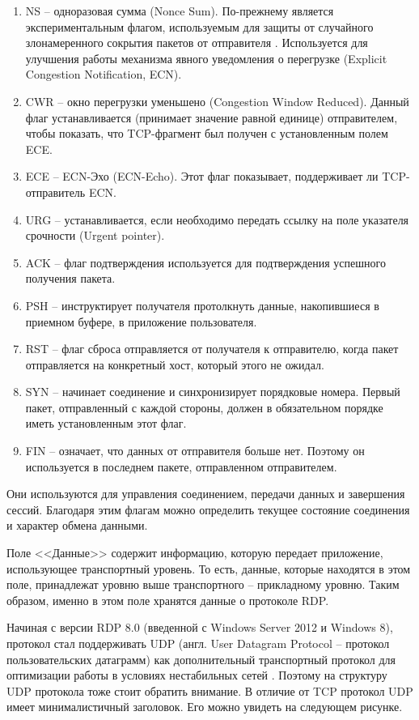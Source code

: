 \documentclass[spec, och, diploma]{SCWorks}
\begin{document}
\begin{enumerate}
  \item NS -- одноразовая сумма (Nonce Sum). По-прежнему является экспериментальным флагом, используемым для защиты от случайного
  злонамеренного сокрытия пакетов от отправителя \cite{tcpflags}. Используется для улучшения работы механизма явного уведомления 
  о перегрузке (Explicit Congestion Notification, ECN).
  \item CWR -- окно перегрузки уменьшено (Congestion Window Reduced). 
  Данный флаг устанавливается (принимает значение равной единице) отправителем, чтобы показать, что TCP-фрагмент был
  получен с установленным полем ECE.
  \item ECE -- ECN-Эхо (ECN-Echo). Этот флаг показывает, поддерживает ли TCP-отправитель ECN.
  \item URG -- устанавливается, если необходимо передать ссылку на поле указателя срочности (Urgent pointer).
  \item ACK -- флаг подтверждения используется для подтверждения успешного получения пакета.
  \item PSH -- инструктирует получателя протолкнуть данные, накопившиеся в приемном буфере, в приложение пользователя.
  \item RST -- флаг сброса отправляется от получателя к отправителю, когда пакет отправляется на конкретный хост, который этого не ожидал.
  \item SYN -- начинает соединение и синхронизирует порядковые номера. Первый пакет, отправленный с каждой стороны, должен в обязательном порядке иметь установленным этот флаг.
  \item FIN -- означает, что данных от отправителя больше нет. Поэтому он используется в последнем пакете, отправленном отправителем.
\end{enumerate}

Они используются для управления соединением, передачи данных и завершения сессий.
Благодаря этим флагам можно определить текущее состояние соединения и характер обмена данными.

Поле <<Данные>> содержит информацию, которую передает приложение, использующее транспортный уровень. То есть, данные, которые 
находятся в этом поле, принадлежат уровню выше транспортного -- прикладному уровню. Таким образом, именно в этом поле хранятся данные о протоколе RDP.

Начиная с версии RDP 8.0 (введенной с Windows Server 2012 и Windows 8), протокол стал поддерживать UDP (англ. User Datagram Protocol -- протокол пользовательских датаграмм)
как дополнительный транспортный протокол для оптимизации работы в условиях нестабильных сетей \cite{udpseg}. Поэтому на структуру UDP протокола тоже стоит обратить внимание.
В отличие от TCP протокол UDP имеет минималистичный заголовок. Его можно увидеть на следующем рисунке.
\end{document}
